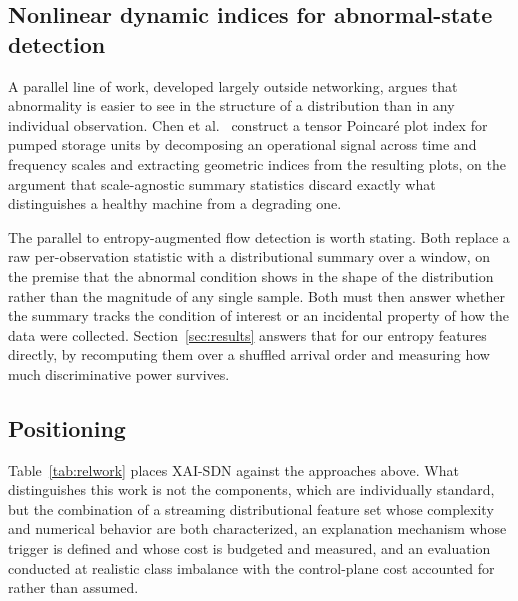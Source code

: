 \documentclass{ieeeaccess}
\begin{document}
\subsection{Nonlinear dynamic indices for abnormal-state detection}
A parallel line of work, developed largely outside networking, argues that abnormality is easier to see in the structure of a distribution than in any individual observation. Chen et al.~\cite{chen2025tppi} construct a tensor Poincar\'{e} plot index for pumped storage units by decomposing an operational signal across time and frequency scales and extracting geometric indices from the resulting plots, on the argument that scale-agnostic summary statistics discard exactly what distinguishes a healthy machine from a degrading one.

The parallel to entropy-augmented flow detection is worth stating. Both replace a raw per-observation statistic with a distributional summary over a window, on the premise that the abnormal condition shows in the shape of the distribution rather than the magnitude of any single sample. Both must then answer whether the summary tracks the condition of interest or an incidental property of how the data were collected. Section~\ref{sec:results} answers that for our entropy features directly, by recomputing them over a shuffled arrival order and measuring how much discriminative power survives.

\subsection{Positioning}
Table~\ref{tab:relwork} places XAI-SDN against the approaches above. What distinguishes this work is not the components, which are individually standard, but the combination of a streaming distributional feature set whose complexity and numerical behavior are both characterized, an explanation mechanism whose trigger is defined and whose cost is budgeted and measured, and an evaluation conducted at realistic class imbalance with the control-plane cost accounted for rather than assumed.
\end{document}
